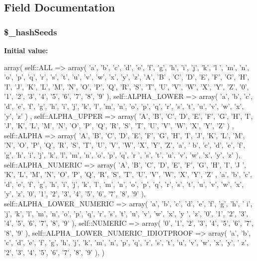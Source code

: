 \subsection{Field Documentation}
\hypertarget{classCXLHash_a4ccb145eb796f708b107b1ed4069bd0f}{
\subsubsection[{\$\_\-hashSeeds}]{\setlength{\rightskip}{0pt plus 5cm}\$\_\-hashSeeds}}
\label{classCXLHash_a4ccb145eb796f708b107b1ed4069bd0f}
{\bfseries Initial value:}
\begin{DoxyCode}
 array(
    self::ALL => array( 'a', 'b', 'c', 'd', 'e', 'f', 'g', 'h', 'i', 'j', 'k', 'l
      ', 'm', 'n', 'o', 'p', 'q', 'r', 's', 't', 'u', 'v', 'w', 'x', 'y', 'z', 'A', 'B'
      , 'C', 'D', 'E', 'F', 'G', 'H', 'I', 'J', 'K', 'L', 'M', 'N', 'O', 'P', 'Q', 'R',
       'S', 'T', 'U', 'V', 'W', 'X', 'Y', 'Z', '0', '1', '2', '3', '4', '5', '6', '7', 
      '8', '9' ),
    self::ALPHA_LOWER => array( 'a', 'b', 'c', 'd', 'e', 'f', 'g', 'h', 'i', 'j',
       'k', 'l', 'm', 'n', 'o', 'p', 'q', 'r', 's', 't', 'u', 'v', 'w', 'x', 'y', 'z' )
      ,
    self::ALPHA_UPPER => array( 'A', 'B', 'C', 'D', 'E', 'F', 'G', 'H', 'I', 'J',
       'K', 'L', 'M', 'N', 'O', 'P', 'Q', 'R', 'S', 'T', 'U', 'V', 'W', 'X', 'Y', 'Z' )
      ,
    self::ALPHA => array( 'A', 'B', 'C', 'D', 'E', 'F', 'G', 'H', 'I', 'J', 'K', 
      'L', 'M', 'N', 'O', 'P', 'Q', 'R', 'S', 'T', 'U', 'V', 'W', 'X', 'Y', 'Z', 'a', '
      b', 'c', 'd', 'e', 'f', 'g', 'h', 'i', 'j', 'k', 'l', 'm', 'n', 'o', 'p', 'q', 'r
      ', 's', 't', 'u', 'v', 'w', 'x', 'y', 'z' ),
    self::ALPHA_NUMERIC => array( 'A', 'B', 'C', 'D', 'E', 'F', 'G', 'H', 'I', 'J
      ', 'K', 'L', 'M', 'N', 'O', 'P', 'Q', 'R', 'S', 'T', 'U', 'V', 'W', 'X', 'Y', 'Z'
      , 'a', 'b', 'c', 'd', 'e', 'f', 'g', 'h', 'i', 'j', 'k', 'l', 'm', 'n', 'o', 'p',
       'q', 'r', 's', 't', 'u', 'v', 'w', 'x', 'y', 'z', '0', '1', '2', '3', '4', '5', 
      '6', '7', '8', '9' ),
    self::ALPHA_LOWER_NUMERIC => array( 'a', 'b', 'c', 'd', 'e', 'f', 'g', 'h', '
      i', 'j', 'k', 'l', 'm', 'n', 'o', 'p', 'q', 'r', 's', 't', 'u', 'v', 'w', 'x', 'y
      ', 'z', '0', '1', '2', '3', '4', '5', '6', '7', '8', '9' ),
    self::NUMERIC => array( '0', '1', '2', '3', '4', '5', '6', '7', '8', '9' ),
    self::ALPHA_LOWER_NUMERIC_IDIOTPROOF => array( 'a', 'b', 'c', 'd', 'e', 'f', 
      'g', 'h', 'j', 'k', 'm', 'n', 'p', 'q', 'r', 's', 't', 'u', 'v', 'w', 'x', 'y', '
      z', '2', '3', '4', '5', '6', '7', '8', '9' ),
  )
\end{DoxyCode}


